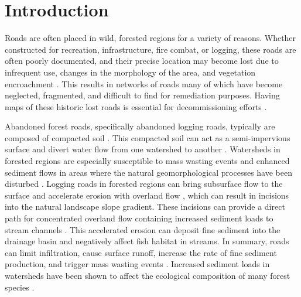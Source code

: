 \documentclass[remotesensing,article,submit,pdftex,moreauthors]{Definitions/mdpi}
\begin{document}



\section{Introduction}

Roads are often placed in wild, forested regions for a variety of reasons. Whether constructed for recreation, infrastructure, fire combat, or logging, these roads are often poorly documented, and their precise location may become lost due to infrequent use, changes in the morphology of the area, and vegetation encroachment \cite{becker, sherba}. This results in networks of roads many of which have become neglected, fragmented, and difficult to find for remediation purposes. Having maps of these historic lost roads is essential for decommissioning efforts \cite{white}.

Abandoned forest roads, specifically abandoned logging roads, typically are composed of compacted soil \cite{rab}. This compacted soil can act as a semi-impervious surface and divert water flow from one watershed to another \cite{troendle}. Watersheds in forested regions are especially susceptible to mass wasting events and enhanced sediment flows in areas where the natural geomorphological processes have been disturbed \cite{luce}. Logging roads in forested regions can bring subsurface flow to the surface and accelerate erosion with overland flow \cite{underwood}, which can result in incisions into the natural landscape slope gradient. These incisions can provide a direct path for concentrated overland flow containing increased sediment loads to stream channels \cite{douglas}. This accelerated erosion can deposit fine sediment into the drainage basin and negatively affect fish habitat in streams. In summary, roads can limit infiltration, cause surface runoff, increase the rate of fine sediment production, and trigger mass wasting events \cite{wemple}. Increased sediment loads in watersheds have been shown to affect the ecological composition of many forest species \cite{wong}. 
\end{document}
